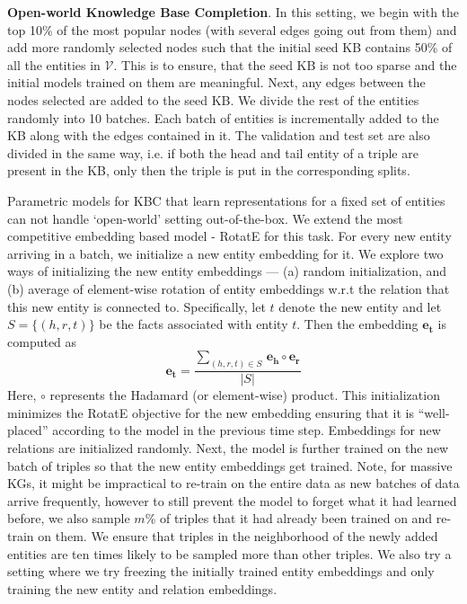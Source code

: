 \documentclass[11pt,a4paper]{article}
\begin{document}
\noindent \textbf{Open-world Knowledge Base Completion}. In this setting, we begin with the top 10\% of the most popular nodes (with several edges going out from them) and add more randomly selected nodes such that the initial seed KB contains 50\% of all the entities in $\mathcal{V}$. This is to ensure, that the seed KB is not too sparse and the initial models trained on them are meaningful. Next, any edges between the nodes selected are added to the seed KB. We divide the rest of the entities randomly into 10 batches. Each batch of entities is incrementally added to the KB along with the edges contained in it. The validation and test set are also divided in the same way, i.e. if both the head and tail entity of a triple are present in the KB, only then the triple is put in the corresponding splits.

Parametric models for KBC that learn representations for a fixed set of entities can not handle `open-world' setting out-of-the-box. We extend the most competitive embedding based model - RotatE \cite{sun2019rotate} for this task. For every new entity arriving in a batch, we initialize a new entity embedding for it. We explore two ways of initializing the new entity embeddings --- (a) random initialization, and (b) average of element-wise rotation of entity embeddings w.r.t the relation that this new entity is connected to. Specifically, let $t$ denote the new entity and let $S = \{(h, r, t)\}$ be the facts associated with entity $t$. Then the embedding $\mathbf{e_t}$ is computed as
\begin{equation}
\mathbf{e_{t}}= \frac{\sum_{(h, r, t) \in S}\, \mathbf{e_h}\circ \mathbf{e_r}}{|S|}
\end{equation}
Here, $\circ$ represents the Hadamard (or element-wise) product. This initialization minimizes the RotatE objective for the new embedding ensuring that it is ``well-placed'' according to the model in the previous time step. Embeddings for new relations are initialized randomly. Next, the model is further trained on the new batch of triples so that the new entity embeddings get trained.  Note, for massive KGs, it might be impractical to re-train on the entire data as new batches of data arrive frequently, however to still prevent the model to forget what it had learned before, we also sample $m$\% of triples that it had already been trained on and re-train on them. We ensure that triples in the neighborhood of the newly added entities are ten times likely to be sampled more than other triples. We also try a setting where we try freezing the initially trained entity embeddings and only training the new entity and relation embeddings.
\end{document}
